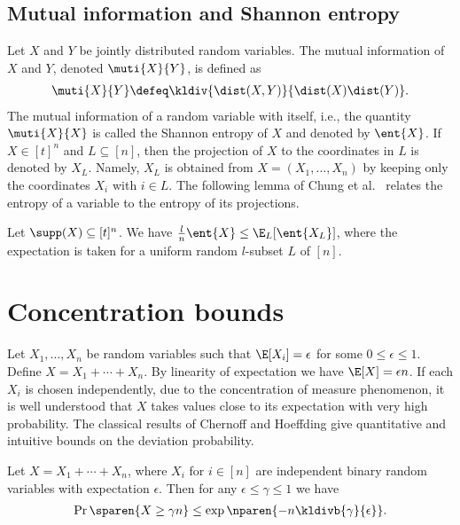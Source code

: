 \subsection{Mutual information and Shannon entropy}
\label{sec:prelim:muti}
Let $X$ and $Y$ be jointly distributed random variables.
The 
mutual information of $X$ and $Y$, 
denoted $\muti{X}{Y}$, is defined as
\begin{align}
\muti{X}{Y} \defeq \kldiv{\dist(X,Y)}{\dist(X)\dist(Y)}.
\label{eq:muti-def}
\end{align}
The mutual information of a random variable 
with itself, i.e., the quantity $\muti{X}{X}$ is 
called the Shannon entropy of $X$ and denoted by $\ent{X}$.
If $X\in[t]^n$ and $L\subseteq[n]$, then the projection of $X$
to the coordinates in $L$ is denoted by $X_L$. Namely, $X_L$ is
obtained from $X=(X_1,\ldots,X_n)$ by keeping only the
coordinates $X_i$ with $i\in L$. The following lemma of Chung et
al.~\cite{ChungGFS1986} relates the entropy of a variable to the
entropy of its projections.
\begin{lemma}
\label{lem:ent-subset}
Let $\supp(X)\subseteq[t]^n$. We have
$\frac{l}{n}\ent{X} \leq \E_L[\ent{X_L}]$, where the expectation is taken for
a uniform random $l$-subset $L$ of $[n]$.
\end{lemma}

\section{Concentration bounds}
Let $X_1,\ldots, X_n$ be random
variables such that $\E[X_i] = \epsilon$ for 
some $0\leq \epsilon\leq 1$. Define $X = 
X_1+\cdots + X_n$. By linearity of 
expectation we have $\E[X] = \epsilon n$.
If each $X_i$ is chosen independently,
due  to the concentration of measure phenomenon,
it is well understood that $X$ takes values 
close to its expectation with very high probability.
The classical results of Chernoff 
\cite{Chernoff1952} and Hoeffding 
\cite{Hoeffding1963} give quantitative and 
intuitive bounds on the deviation probability.
\begin{theorem}
\label{thm:chernoff}
Let $X=X_1+\cdots+ X_n$, where $X_i$ for 
$i\in [n]$ are independent binary random 
variables with expectation $\epsilon$. Then 
for any $\epsilon\leq\gamma\leq 1$ we have 
\begin{align*}
  \Pr\sparen{X\geq\gamma n}
    \leq \exp\nparen{-n\kldivb{\gamma}{\epsilon}}.
\end{align*}
\end{theorem}

